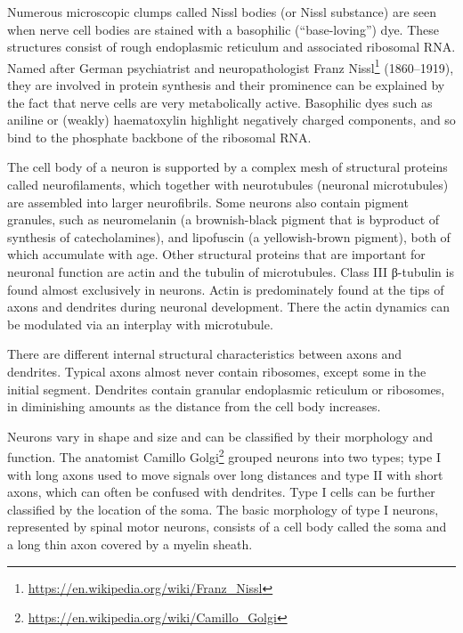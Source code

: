 \documentclass[]{book}
\let\rmarkdownfootnote\footnote%
\def\footnote{\protect\rmarkdownfootnote}
\renewcommand{\href}[2]{#2\footnote{\url{#1}}}
\begin{document}
Numerous microscopic clumps called Nissl bodies (or Nissl substance) are seen when nerve cell bodies are stained with a basophilic (``base-loving'') dye. These structures consist of rough endoplasmic reticulum and associated ribosomal RNA. Named after German psychiatrist and neuropathologist \href{https://en.wikipedia.org/wiki/Franz_Nissl}{Franz Nissl} (1860--1919), they are involved in protein synthesis and their prominence can be explained by the fact that nerve cells are very metabolically active. Basophilic dyes such as aniline or (weakly) haematoxylin highlight negatively charged components, and so bind to the phosphate backbone of the ribosomal RNA.

The cell body of a neuron is supported by a complex mesh of structural proteins called neurofilaments, which together with neurotubules (neuronal microtubules) are assembled into larger neurofibrils. Some neurons also contain pigment granules, such as neuromelanin (a brownish-black pigment that is byproduct of synthesis of catecholamines), and lipofuscin (a yellowish-brown pigment), both of which accumulate with age. Other structural proteins that are important for neuronal function are actin and the tubulin of microtubules. Class III β-tubulin is found almost exclusively in neurons. Actin is predominately found at the tips of axons and dendrites during neuronal development. There the actin dynamics can be modulated via an interplay with microtubule.

There are different internal structural characteristics between axons and dendrites. Typical axons almost never contain ribosomes, except some in the initial segment. Dendrites contain granular endoplasmic reticulum or ribosomes, in diminishing amounts as the distance from the cell body increases.

Neurons vary in shape and size and can be classified by their morphology and function. The anatomist \href{https://en.wikipedia.org/wiki/Camillo_Golgi}{Camillo Golgi} grouped neurons into two types; type I with long axons used to move signals over long distances and type II with short axons, which can often be confused with dendrites. Type I cells can be further classified by the location of the soma. The basic morphology of type I neurons, represented by spinal motor neurons, consists of a cell body called the soma and a long thin axon covered by a myelin sheath.
\end{document}
